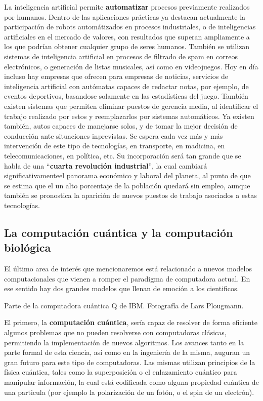 La inteligencia artificial permite \textbf{automatizar} procesos previamente
realizados por humanos. Dentro de las aplicaciones prácticas ya destacan
actualmente la participación de robots automátizados en procesos industriales,
o de inteligencias artificiales en el mercado de valores, con resultados que
superan ampliamente a los que podrían obtener cualquier grupo de seres humanos.
También se utilizan sistemas de inteligencia artificial en procesos de filtrado
de spam en correos electrónicos, o generación de listas musicales, así como en
videojuegos. Hoy en día incluso hay empresas que ofrecen para empresas de noticias,
servicios de inteligencia artificial con autómatas capaces de redactar notas, por
ejemplo, de eventos deportivos, basandose solamente en las estadísticas del juego.
También existen sistemas que permiten eliminar puestos de gerencia media, al
identificar el trabajo realizado por estos y reemplazarlos por sistemas automáticos.
Ya existen también, autos capaces de manejarse solos, y de tomar la mejor decisión
de conducción ante situaciones inprevistas.
Se espera cada vez más y más intervención de este tipo de tecnologías, en transporte,
en madicina, en telecomunicaciones, en política, etc. Su incorporación será tan
grande que se habla de una ``\textbf{cuarta revolución industrial}'', la cual
cambiará significativamenteel panorama económico y laboral del planeta, al punto
de que se estima que el un alto porcentaje de la población quedará sin empleo,
aunque también se pronostica la aparición de nuevos puestos de trabajo asociados
a estas tecnologías.\autocite{wef_2016}


\subsection{La computación cuántica y la computación biológica}

El último area de interés que mencionaremos está relacionado a nuevos modelos
computacionales que vienen a romper el paradigma de computadora actual. En ese
sentido hay dos grandes modelos que llenan de emoción a los cientificos.

{Parte de la computadora cuántica Q de IBM.}
{Fotografía de Lars Plougmann.}

El primero, la \textbf{computación cuántica}, sería capaz de resolver de forma
eficiente algunos problemas que no pueden resolverse con computadoras clásicas,
permitiendo la implementación de nuevos algoritmos. Los avances tanto en la parte
formal de esta ciencia, así como en la ingeniería de la misma, auguran un gran
futuro para este tipo de computadoras. Las mismas utilizan principios de la
física cuántica, tales como la superposición o el enlazamiento cuántico para
manipular información, la cual está codificada como alguna propiedad cuántica
de una particula (por ejemplo la polarización de un fotón, o el spin de un
electrón).\autocite{nielsen_2011}

